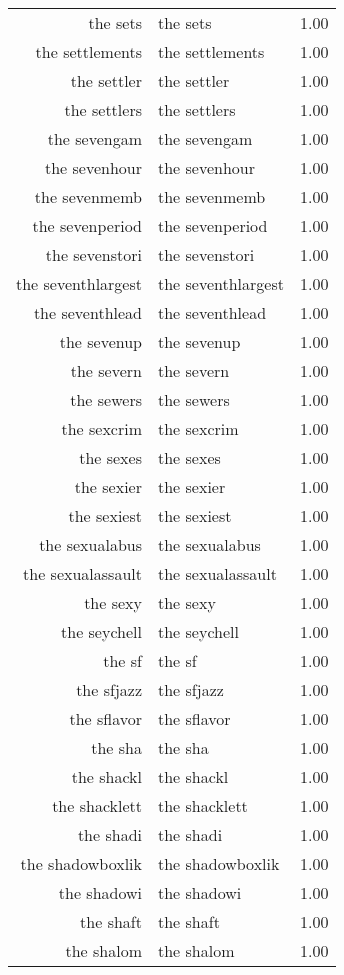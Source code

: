 \begin{table}[ht]
\begin{tabular}{rlr}
  the sets & the sets & 1.00 \\ 
  the settlements & the settlements & 1.00 \\ 
  the settler & the settler & 1.00 \\ 
  the settlers & the settlers & 1.00 \\ 
  the sevengam & the sevengam & 1.00 \\ 
  the sevenhour & the sevenhour & 1.00 \\ 
  the sevenmemb & the sevenmemb & 1.00 \\ 
  the sevenperiod & the sevenperiod & 1.00 \\ 
  the sevenstori & the sevenstori & 1.00 \\ 
  the seventhlargest & the seventhlargest & 1.00 \\ 
  the seventhlead & the seventhlead & 1.00 \\ 
  the sevenup & the sevenup & 1.00 \\ 
  the severn & the severn & 1.00 \\ 
  the sewers & the sewers & 1.00 \\ 
  the sexcrim & the sexcrim & 1.00 \\ 
  the sexes & the sexes & 1.00 \\ 
  the sexier & the sexier & 1.00 \\ 
  the sexiest & the sexiest & 1.00 \\ 
  the sexualabus & the sexualabus & 1.00 \\ 
  the sexualassault & the sexualassault & 1.00 \\ 
  the sexy & the sexy & 1.00 \\ 
  the seychell & the seychell & 1.00 \\ 
  the sf & the sf & 1.00 \\ 
  the sfjazz & the sfjazz & 1.00 \\ 
  the sflavor & the sflavor & 1.00 \\ 
  the sha & the sha & 1.00 \\ 
  the shackl & the shackl & 1.00 \\ 
  the shacklett & the shacklett & 1.00 \\ 
  the shadi & the shadi & 1.00 \\ 
  the shadowboxlik & the shadowboxlik & 1.00 \\ 
  the shadowi & the shadowi & 1.00 \\ 
  the shaft & the shaft & 1.00 \\ 
  the shalom & the shalom & 1.00 \\ 

\end{tabular}
\end{table}
